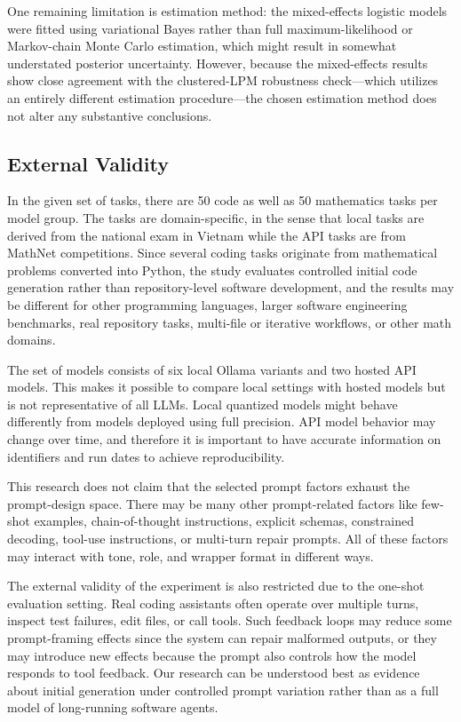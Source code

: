 \documentclass{llncs}
\begin{document}
One remaining limitation is estimation method: the mixed-effects logistic models were fitted using variational Bayes rather than full maximum-likelihood or Markov-chain Monte Carlo estimation, which might result in somewhat understated posterior uncertainty. However, because the mixed-effects results show close agreement with the clustered-LPM robustness check—which utilizes an entirely different estimation procedure—the chosen estimation method does not alter any substantive conclusions.

\subsection{External Validity}\label{external-validity}

In the given set of tasks, there are 50 code as well as 50 mathematics tasks per model group. The tasks are domain-specific, in the sense that local tasks are derived from the national exam in Vietnam while the API tasks are from MathNet competitions. Since several coding tasks originate from mathematical problems converted into Python, the study evaluates controlled initial code generation rather than repository-level software development, and the results may be different for other programming languages, larger software engineering benchmarks, real repository tasks, multi-file or iterative workflows, or other math domains.

The set of models consists of six local Ollama variants and two hosted API models. This makes it possible to compare local settings with hosted models but is not representative of all LLMs. Local quantized models might behave differently from models deployed using full precision. API model behavior may change over time, and therefore it is important to have accurate information on identifiers and run dates to achieve reproducibility.

This research does not claim that the selected prompt factors exhaust the prompt-design space. There may be many other prompt-related factors like few-shot examples, chain-of-thought instructions, explicit schemas, constrained decoding, tool-use instructions, or multi-turn repair prompts. All of these factors may interact with tone, role, and wrapper format in different ways.

The external validity of the experiment is also restricted due to the one-shot evaluation setting. Real coding assistants often operate over multiple turns, inspect test failures, edit files, or call tools. Such feedback loops may reduce some prompt-framing effects since the system can repair malformed outputs, or they may introduce new effects because the prompt also controls how the model responds to tool feedback. Our research can be understood best as evidence about initial generation under controlled prompt variation rather than as a full model of long-running software agents.
\end{document}

